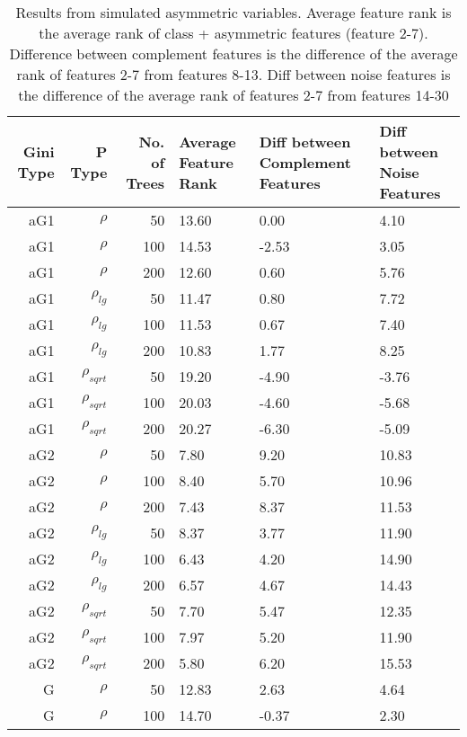 \documentclass[twoside,11pt]{article}
\begin{document}
\begin{table}%
  \centering
  \caption{Results from simulated asymmetric variables. Average feature rank is the average rank of class + asymmetric features (feature 2-7). Difference between complement features is the difference of the average rank of features 2-7 from features 8-13. Diff between noise features is the difference of the average rank of features 2-7 from features 14-30}
\begin{tabular}{rrrp{2.5cm}p{2.5cm}p{2.5cm}}
\hline
Gini Type & P Type & No. of Trees & Average Feature Rank & Diff between Complement Features & Diff between Noise Features \bigstrut\\
\hline
\renewcommand{\arraystretch}{.5}
aG1   & $\rho$ & 50    & 13.60 & 0.00  & 4.10 \bigstrut[t]\\
aG1   & $\rho$ & 100   & 14.53 & -2.53 & 3.05 \\
aG1   & $\rho$ & 200   & 12.60 & 0.60  & 5.76 \\
aG1   & $\rho_{lg}$ & 50    & 11.47 & 0.80  & 7.72 \\
aG1   & $\rho_{lg}$ & 100   & 11.53 & 0.67  & 7.40 \\
aG1   & $\rho_{lg}$ & 200   & 10.83 & 1.77  & 8.25 \\
aG1   & $\rho_{sqrt}$ & 50    & 19.20 & -4.90 & -3.76 \\
aG1   & $\rho_{sqrt}$ & 100   & 20.03 & -4.60 & -5.68 \\
aG1   & $\rho_{sqrt}$ & 200   & 20.27 & -6.30 & -5.09 \\
aG2   & $\rho$ & 50    & 7.80  & 9.20  & 10.83 \\
aG2   & $\rho$ & 100   & 8.40  & 5.70  & 10.96 \\
aG2   & $\rho$ & 200   & 7.43  & 8.37  & 11.53 \\
aG2   & $\rho_{lg}$ & 50    & 8.37  & 3.77  & 11.90 \\
aG2   & $\rho_{lg}$ & 100   & 6.43  & 4.20  & 14.90 \\
aG2   & $\rho_{lg}$ & 200   & 6.57  & 4.67  & 14.43 \\
aG2   & $\rho_{sqrt}$ & 50    & 7.70  & 5.47  & 12.35 \\
aG2   & $\rho_{sqrt}$ & 100   & 7.97  & 5.20  & 11.90 \\
aG2   & $\rho_{sqrt}$ & 200   & 5.80  & 6.20  & 15.53 \\
G     & $\rho$ & 50    & 12.83 & 2.63  & 4.64 \\
G     & $\rho$ & 100   & 14.70 & -0.37 & 2.30 \\

\end{tabular}
\end{table}
\end{document}
